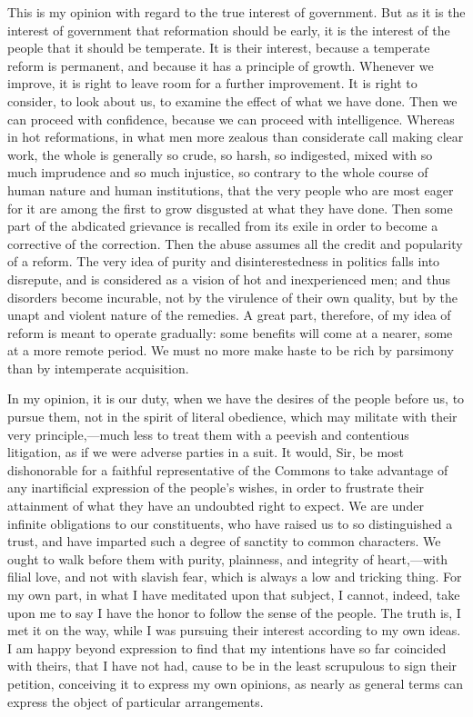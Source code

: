 This is my opinion with regard to the true interest of government. But as it is the interest of government that reformation should be early, it is the interest of the people that it should be temperate. It is their interest, because a temperate reform is permanent, and because it has a principle of growth. Whenever we improve, it is right to leave room for a further improvement. It is right to consider, to look about us, to examine the effect of what we have done. Then we can proceed with confidence, because we can proceed with intelligence. Whereas in hot reformations, in what men more zealous than considerate call making clear work, the whole is generally so crude, so harsh, so indigested, mixed with so much imprudence and so much injustice, so contrary to the whole course of human nature and human institutions, that the very people who are most eager for it are among the first to grow disgusted at what they have done. Then some part of the abdicated grievance is recalled from its exile in order to become a corrective of the correction. Then the abuse assumes all the credit and popularity of a reform. The very idea of purity and disinterestedness in politics falls into disrepute, and is considered as a vision of hot and inexperienced men; and thus disorders become incurable, not by the virulence of their own quality, but by the unapt and violent nature of the remedies. A great part, therefore, of my idea of reform is meant to operate gradually: some benefits will come at a nearer, some at a more remote period. We must no more make haste to be rich by parsimony than by intemperate acquisition.

In my opinion, it is our duty, when we have the desires of the people before us, to pursue them, not in the spirit of literal obedience, which may militate with their very principle,—much less to treat them with a peevish and contentious litigation, as if we were adverse parties in a suit. It would, Sir, be most dishonorable for a faithful representative of the Commons to take advantage of any inartificial expression of the people's wishes, in order to frustrate their attainment of what they have an undoubted right to expect. We are under infinite obligations to our constituents, who have raised us to so distinguished a trust, and have imparted such a degree of sanctity to common characters. We ought to walk before them with purity, plainness, and integrity of heart,—with filial love, and not with slavish fear, which is always a low and tricking thing. For my own part, in what I have meditated upon that subject, I cannot, indeed, take upon me to say I have the honor to follow the sense of the people. The truth is, I met it on the way, while I was pursuing their interest according to my own ideas. I am happy beyond expression to find that my intentions have so far coincided with theirs, that I have not had, cause to be in the least scrupulous to sign their petition, conceiving it to express my own opinions, as nearly as general terms can express the object of particular arrangements.

